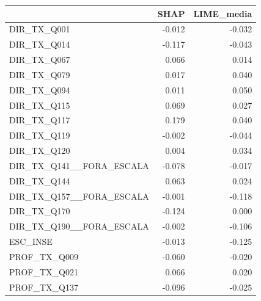 \begin{tabular}{lrr}
\toprule
 & SHAP & LIME\_media \\
\midrule
DIR\_TX\_Q001 & -0.012 & -0.032 \\
DIR\_TX\_Q014 & -0.117 & -0.043 \\
DIR\_TX\_Q067 & 0.066 & 0.014 \\
DIR\_TX\_Q079 & 0.017 & 0.040 \\
DIR\_TX\_Q094 & 0.011 & 0.050 \\
DIR\_TX\_Q115 & 0.069 & 0.027 \\
DIR\_TX\_Q117 & 0.179 & 0.040 \\
DIR\_TX\_Q119 & -0.002 & -0.044 \\
DIR\_TX\_Q120 & 0.004 & 0.034 \\
DIR\_TX\_Q141\_\_FORA\_ESCALA & -0.078 & -0.017 \\
DIR\_TX\_Q144 & 0.063 & 0.024 \\
DIR\_TX\_Q157\_\_FORA\_ESCALA & -0.001 & -0.118 \\
DIR\_TX\_Q170 & -0.124 & 0.000 \\
DIR\_TX\_Q190\_\_FORA\_ESCALA & -0.002 & -0.106 \\
ESC\_INSE & -0.013 & -0.125 \\
PROF\_TX\_Q009 & -0.060 & -0.020 \\
PROF\_TX\_Q021 & 0.066 & 0.020 \\
PROF\_TX\_Q137 & -0.096 & -0.025 \\
\bottomrule
\end{tabular}
